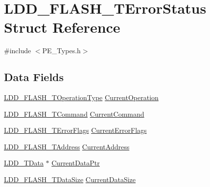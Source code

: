 \hypertarget{struct_l_d_d___f_l_a_s_h___t_error_status}{\section{L\-D\-D\-\_\-\-F\-L\-A\-S\-H\-\_\-\-T\-Error\-Status Struct Reference}
\label{struct_l_d_d___f_l_a_s_h___t_error_status}
}


{\ttfamily \#include $<$P\-E\-\_\-\-Types.\-h$>$}

\subsection*{Data Fields}
\begin{DoxyCompactItemize}
\item 
\hyperlink{group___p_e___types__module_ga59054b7863240b77bde12e8762d3da5a}{L\-D\-D\-\_\-\-F\-L\-A\-S\-H\-\_\-\-T\-Operation\-Type} \hyperlink{struct_l_d_d___f_l_a_s_h___t_error_status_aa1b99bfba14fdc8379522df15da47e7b}{Current\-Operation}
\item 
\hyperlink{group___p_e___types__module_gac01cb076a7d214b9644c76681280e031}{L\-D\-D\-\_\-\-F\-L\-A\-S\-H\-\_\-\-T\-Command} \hyperlink{struct_l_d_d___f_l_a_s_h___t_error_status_a8121cb2540ba191287d219e4f1a675dd}{Current\-Command}
\item 
\hyperlink{group___p_e___types__module_ga0ca2b410992c2399635c62a94ab9dba5}{L\-D\-D\-\_\-\-F\-L\-A\-S\-H\-\_\-\-T\-Error\-Flags} \hyperlink{struct_l_d_d___f_l_a_s_h___t_error_status_a1f8e3f3fd6ceb25960d234254aee7e13}{Current\-Error\-Flags}
\item 
\hyperlink{group___p_e___types__module_gac67b6067e2a5242a8ffaf0d6dcee92c6}{L\-D\-D\-\_\-\-F\-L\-A\-S\-H\-\_\-\-T\-Address} \hyperlink{struct_l_d_d___f_l_a_s_h___t_error_status_aede15779720f091b04e8fb4b423dc654}{Current\-Address}
\item 
\hyperlink{group___p_e___types__module_gade8ef9401405bd941b6da738b807f980}{L\-D\-D\-\_\-\-T\-Data} $\ast$ \hyperlink{struct_l_d_d___f_l_a_s_h___t_error_status_a2c071a468d63d1572589e327dfe46fd4}{Current\-Data\-Ptr}
\item 
\hyperlink{group___p_e___types__module_ga070ee4b9c033934c6e33bc20fc18afc5}{L\-D\-D\-\_\-\-F\-L\-A\-S\-H\-\_\-\-T\-Data\-Size} \hyperlink{struct_l_d_d___f_l_a_s_h___t_error_status_ab7c77ef770367308c125aa95c4f0e465}{Current\-Data\-Size}
\end{DoxyCompactItemize}


